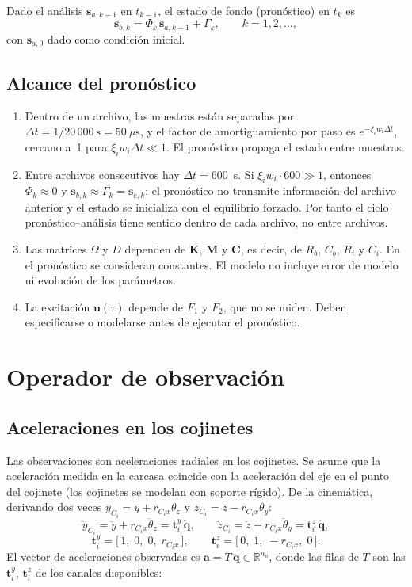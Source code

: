 Dado el análisis $\mathbf s_{a,k-1}$ en $t_{k-1}$, el estado de fondo (pronóstico) en $t_k$ es
\[
\mathbf s_{b,k}=\Phi_k\,\mathbf s_{a,k-1}+\Gamma_k,\qquad k=1,2,\ldots,
\]
con $\mathbf s_{a,0}$ dado como condición inicial.

\subsection{Alcance del pronóstico}

\begin{enumerate}
\item Dentro de un archivo, las muestras están separadas por $\Delta t=1/20\,000~\text{s}=50~\mu\text{s}$, y el factor de amortiguamiento por paso es $e^{-\xi_iw_i\Delta t}$, cercano a~1 para $\xi_iw_i\Delta t\ll1$. El pronóstico propaga el estado entre muestras.
\item Entre archivos consecutivos hay $\Delta t=600$~s. Si $\xi_iw_i\cdot600\gg1$, entonces $\Phi_k\approx0$ y $\mathbf s_{b,k}\approx\Gamma_k=\mathbf s_{e,k}$: el pronóstico no transmite información del archivo anterior y el estado se inicializa con el equilibrio forzado. Por tanto el ciclo pronóstico--análisis tiene sentido dentro de cada archivo, no entre archivos.
\item Las matrices $\Omega$ y $D$ dependen de $\mathbf K$, $\mathbf M$ y $\mathbf C$, es decir, de $R_b$, $C_b$, $R_i$ y $C_i$. En el pronóstico se consideran constantes. El modelo no incluye error de modelo ni evolución de los parámetros.
\item La excitación $\mathbf u(\tau)$ depende de $F_1$ y $F_2$, que no se miden. Deben especificarse o modelarse antes de ejecutar el pronóstico.
\end{enumerate}

\section{Operador de observación}

\subsection{Aceleraciones en los cojinetes}

Las observaciones son aceleraciones radiales en los cojinetes. Se asume que la aceleración medida en la carcasa coincide con la aceleración del eje en el punto del cojinete (los cojinetes se modelan con soporte rígido). De la cinemática, derivando dos veces $y_{C_i}=y+r_{C_ix}\theta_z$ y $z_{C_i}=z-r_{C_ix}\theta_y$:
\[
\ddot y_{C_i}=\ddot y+r_{C_ix}\ddot\theta_z=\mathbf t_i^{y}\,\ddot{\mathbf q},\qquad
\ddot z_{C_i}=\ddot z-r_{C_ix}\ddot\theta_y=\mathbf t_i^{z}\,\ddot{\mathbf q},
\]
\[
\mathbf t_i^{y}=\big[\,1,\;0,\;0,\;r_{C_ix}\,\big],\qquad
\mathbf t_i^{z}=\big[\,0,\;1,\;-r_{C_ix},\;0\,\big].
\]
El vector de aceleraciones observadas es $\mathbf a=T\,\ddot{\mathbf q}\in\mathbb R^{n_o}$, donde las filas de $T$ son las $\mathbf t_i^{y}$, $\mathbf t_i^{z}$ de los canales disponibles:

